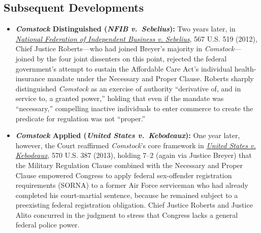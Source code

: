 \documentclass[12pt]{article}
\begin{document}
\subsection{Subsequent Developments}

\begin{itemize}

\item \textbf{\textit{Comstock} Distinguished (\textit{NFIB v.\ Sebelius}):} Two years later, in \href{https://supreme.justia.com/cases/federal/us/567/519/}{\textit{National Federation of Independent Business v. Sebelius}}, 567 U.S. 519 (2012), Chief Justice Roberts---who had joined Breyer's majority in \textit{Comstock}---joined by the four joint dissenters on this point, rejected the federal government's attempt to sustain the Affordable Care Act's individual health-insurance mandate under the Necessary and Proper Clause. Roberts sharply distinguished \textit{Comstock} as an exercise of authority ``derivative of, and in service to, a granted power,'' holding that even if the mandate was ``necessary,'' compelling inactive individuals to enter commerce to create the predicate for regulation was not ``proper.''

\item \textbf{\textit{Comstock} Applied (\textit{United States v.\ Kebodeaux}):} One year later, however, the Court reaffirmed \textit{Comstock}'s core framework in \href{https://supreme.justia.com/cases/federal/us/570/387/}{\textit{United States v. Kebodeaux}}, 570 U.S. 387 (2013), holding 7--2 (again via Justice Breyer) that the Military Regulation Clause combined with the Necessary and Proper Clause empowered Congress to apply federal sex-offender registration requirements (SORNA) to a former Air Force serviceman who had already completed his court-martial sentence, because he remained subject to a preexisting federal registration obligation. Chief Justice Roberts and Justice Alito concurred in the judgment to stress that Congress lacks a general federal police power.

\end{itemize}
\end{document}
